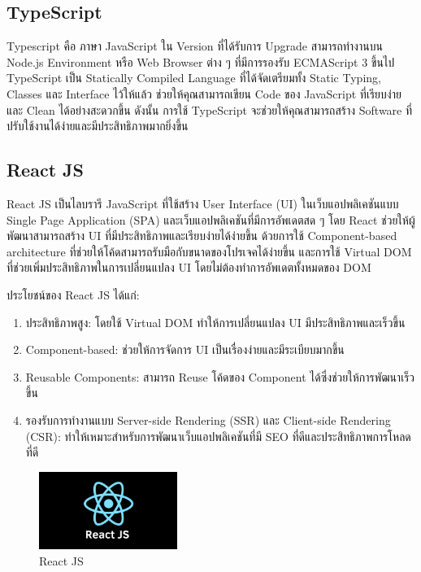 \subsection{TypeScript}
Typescript \cite{web:typescript} คือ ภาษา JavaScript ใน Version ที่ได้รับการ Upgrade สามารถทำงานบน Node.js Environment หรือ Web Browser ต่าง ๆ ที่มีการรองรับ ECMAScript 3 ขึ้นไป TypeScript เป็น Statically Compiled Language ที่ได้จัดเตรียมทั้ง Static Typing, Classes และ Interface ไว้ให้แล้ว ช่วยให้คุณสามารถเขียน Code ของ JavaScript ที่เรียบง่ายและ Clean ได้อย่างสะดวกขึ้น ดังนั้น การใช้ TypeScript จะช่วยให้คุณสามารถสร้าง Software ที่ปรับใช้งานได้ง่ายและมีประสิทธิภาพมากยิ่งขึ้น

\subsection{React JS}
React JS \cite{web:reactjs} เป็นไลบรารี JavaScript ที่ใช้สร้าง User Interface (UI) ในเว็บแอปพลิเคชันแบบ Single Page Application (SPA) และเว็บแอปพลิเคชันที่มีการอัพเดตสด ๆ โดย React ช่วยให้ผู้พัฒนาสามารถสร้าง UI ที่มีประสิทธิภาพและเรียบง่ายได้ง่ายขึ้น ด้วยการใช้ Component-based architecture ที่ช่วยให้โค้ดสามารถรับมือกับขนาดของโปรเจคได้ง่ายขึ้น และการใช้ Virtual DOM ที่ช่วยเพิ่มประสิทธิภาพในการเปลี่ยนแปลง UI โดยไม่ต้องทำการอัพเดตทั้งหมดของ DOM

ประโยชน์ของ React JS ได้แก่:

\begin{enumerate}
    \item ประสิทธิภาพสูง: โดยใช้ Virtual DOM ทำให้การเปลี่ยนแปลง UI มีประสิทธิภาพและเร็วขึ้น

    \item Component-based: ช่วยให้การจัดการ UI เป็นเรื่องง่ายและมีระเบียบมากขึ้น

    \item Reusable Components: สามารถ Reuse โค้ดของ Component ได้ซึ่งช่วยให้การพัฒนาเร็วขึ้น

    \item รองรับการทำงานแบบ Server-side Rendering (SSR) และ Client-side Rendering (CSR): ทำให้เหมาะสำหรับการพัฒนาเว็บแอปพลิเคชันที่มี SEO ที่ดีและประสิทธิภาพการโหลดที่ดี
\end{enumerate}

\begin{figure}
    \centering
    \includegraphics[width=0.4\textwidth]{img/reactjs.png}
    \caption{React JS}
    \label{fig:reactjs}
\end{figure}

